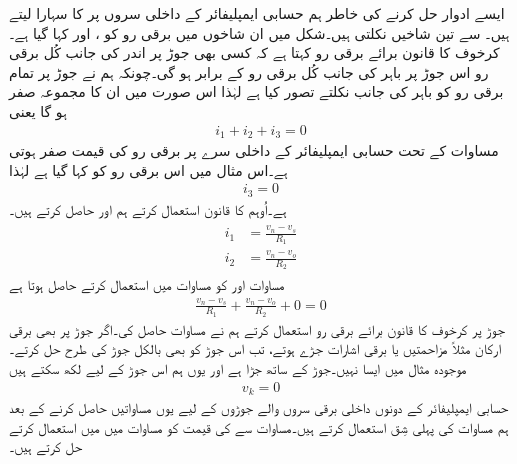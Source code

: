 ایسے  ادوار حل کرنے کی خاطر ہم حسابی ایمپلیفائر کے داخلی سروں پر   کا سہارا لیتے ہیں۔   سے تین شاخیں نکلتی ہیں۔شکل میں ان شاخوں میں برقی رو کو  ،  اور  کہا گیا ہے۔کرخوف کا قانون برائے برقی رو  کہتا ہے کہ کسی بھی جوڑ پر اندر کی جانب کُل برقی رو اس جوڑ پر باہر کی جانب کُل برقی رو کے برابر ہو گی۔چونکہ ہم نے جوڑ پر تمام برقی رو کو باہر کی جانب نکلتے تصور کیا ہے لہٰذا اس صورت میں ان کا مجموعہ صفر ہو گا یعنی
\begin{align} \label{مساوات_منفی_منفی_مداخل_کے_جوڑ_پر_رو}
i_1+i_2+i_3 = 0
\end{align}
مساوات   کے تحت حسابی ایمپلیفائر کے داخلی سرے پر برقی رو کی قیمت صفر ہوتی ہے۔اس مثال میں اس برقی رو کو  کہا گیا ہے لہٰذا
\begin{align} \label{مساوات_حسابی_منفی_سرے_پر_صفر_رو}
i_3=0
\end{align}
ہے۔اُوہم کا قانون استعمال کرتے ہم  اور  حاصل کرتے ہیں۔
\begin{gather} 
\begin{aligned}\label{مساوات_منفی_بقایا_داخلی_رو}
i_1& =\frac{v_n-v_s}{R_1}\\
i_2 &=\frac{v_n-v_o}{R_2}
\end{aligned}
\end{gather}
مساوات   اور   کو مساوات   میں استعمال کرتے حاصل ہوتا ہے
\begin{align} \label{مساوات_منفی_کا_حصول}
\frac{v_n - v_s}{R_1}+\frac{v_n-v_o}{R_2}+0=0
\end{align}
	جوڑ  پر کرخوف کا قانون برائے برقی رو استعمال کرتے ہم نے مساوات   حاصل کی۔اگر جوڑ  پر بھی برقی ارکان مثلاً مزاحمتیں یا برقی اشارات جڑے ہوتے، تب اس جوڑ کو بھی بالکل جوڑ  کی طرح حل کرتے۔موجودہ مثال میں ایسا نہیں۔جوڑ   کے ساتھ جڑا ہے اور یوں ہم اس جوڑ کے لیے لکھ سکتے ہیں
\begin{align} \label{مساوات_منفی_مثبت__زمین_پر}
v_k=0
\end{align}
	حسابی ایمپلیفائر کے دونوں داخلی برقی سروں والے جوڑوں کے لیے یوں مساواتیں حاصل کرنے کے بعد ہم مساوات   کی پہلی شِق استعمال کرتے ہیں۔مساوات   سے  کی قیمت کو مساوات   میں  میں استعمال کرتے حل کرتے ہیں۔
